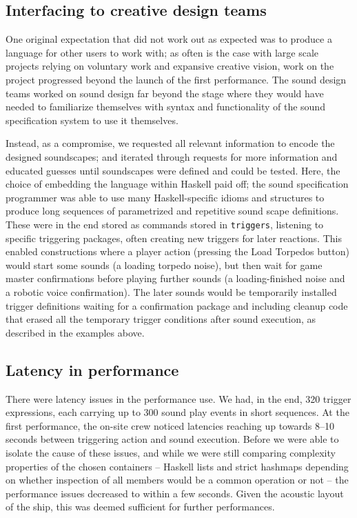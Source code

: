 \subsection{Interfacing to creative design teams}
\label{sec:interf-creat-design}

One original expectation that did not work out as expected was to
produce a language for other users to work with; as often is the case
with large scale projects relying on voluntary work and expansive
creative vision, work on the project progressed beyond the launch of
the first performance. The sound design teams worked on sound design
far beyond the stage where they would have needed to familiarize
themselves with syntax and functionality of the sound specification
system to use it themselves.

Instead, as a compromise, we requested all relevant information to
encode the designed soundscapes; and iterated through requests for
more information and educated guesses until soundscapes were defined
and could be tested. Here, the choice of embedding the language within
Haskell paid off; the sound specification programmer was able to use
many Haskell-specific idioms and structures to produce long sequences
of parametrized and repetitive sound scape definitions. These were in
the end stored as commands stored in \texttt{triggers}, listening to specific triggering packages,
often creating new triggers for later reactions. This enabled
constructions where a player action (pressing the Load Torpedos
button) would start some sounds (a loading torpedo noise), but then
wait for game master confirmations before playing further sounds (a
loading-finished noise and a robotic voice confirmation). The later
sounds would be temporarily installed trigger definitions waiting for
a confirmation package and including cleanup code that erased all the
temporary trigger conditions after sound execution, as described in
the examples above.

\subsection{Latency in performance}
\label{sec:latency-performance}

There were latency issues in the performance use. We had, in the end,
320 trigger expressions, each carrying up to 300 sound play events in
short sequences. At the first performance, the on-site crew noticed
latencies reaching up towards 8--10 seconds between triggering action
and sound execution. Before we were able to isolate the cause of these
issues, and while we were still comparing complexity properties of the
chosen containers -- Haskell lists and strict hashmaps depending on
whether inspection of all members would be a common operation or not
-- the performance issues decreased to within a few seconds. Given the
acoustic layout of the ship, this was deemed sufficient for further
performances. 

